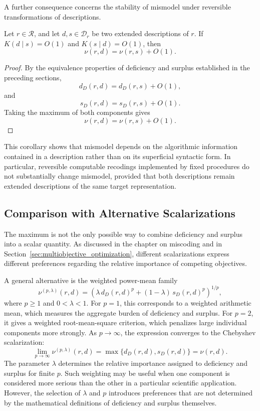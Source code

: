 A further consequence concerns the stability of mismodel under reversible transformations of descriptions.

\begin{corollary}
\label{cor:mismodel_reversible_recoding}
Let $r\in\mathcal R$, and let $d,s\in\mathcal D_r$ be two extended descriptions of $r$. If $K(d\mid s)=O(1)$ and $K(s\mid d)=O(1)$, then
\[
\nu(r,d)=\nu(r,s)+O(1).
\]
\end{corollary}
\begin{proof}
By the equivalence properties of deficiency and surplus established in the preceding sections,
\[
d_D(r,d)=d_D(r,s)+O(1),
\]
and
\[
s_D(r,d)=s_D(r,s)+O(1).
\]
Taking the maximum of both components gives
\[
\nu(r,d)=\nu(r,s)+O(1).
\]
\end{proof}

This corollary shows that mismodel depends on the algorithmic information contained in a description rather than on its superficial syntactic form. In particular, reversible computable recodings implemented by fixed procedures do not substantially change mismodel, provided that both descriptions remain extended descriptions of the same target representation.


\subsection*{Comparison with Alternative Scalarizations}

The maximum is not the only possible way to combine deficiency and surplus into a scalar quantity. As discussed in the chapter on miscoding and in Section~\ref{sec:multiobjective_optimization}, different scalarizations express different preferences regarding the relative importance of competing objectives.

A general alternative is the weighted power-mean family
\[
\nu^{(p,\lambda)}(r,d) = \left(\lambda\,d_D(r,d)^p + (1-\lambda)\,s_D(r,d)^p \right)^{1/p},
\]
where $p\ge 1$ and $0<\lambda<1$. For $p=1$, this corresponds to a weighted arithmetic mean, which measures the aggregate burden of deficiency and surplus. For $p=2$, it gives a weighted root-mean-square criterion, which penalizes large individual
components more strongly. As $p\to\infty$, the expression converges to the Chebyshev scalarization:
\[
\lim_{p\to\infty}\nu^{(p,\lambda)}(r,d) = \max\{d_D(r,d),s_D(r,d)\} = \nu(r,d).
\]
The parameter $\lambda$ determines the relative importance assigned to deficiency and surplus for finite $p$. Such weighting may be useful when one component is considered more serious than the other in a particular scientific application. However, the selection of $\lambda$ and $p$ introduces preferences that are not determined by the mathematical definitions of deficiency and surplus themselves.

